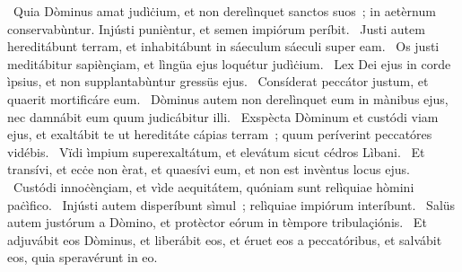 {~Quia Dòminus amat judìċium, et non derelìnquet sanctos suos~; in aetèrnum conservabùntur. Injústi punièntur, et semen impiórum períbit. 
~Justi autem hereditábunt terram, et inhabitábunt in sáeculum sáeculi super eam. 
~Os justi meditábitur sapiènçiam, et lìngüa ejus loquétur judìċium. 
~Lex Dei ejus in corde ìpsius, et non supplantabùntur gressüs ejus. 
~Consíderat peccátor justum, et quaerit mortificáre eum. 
~Dòminus autem non derelìnquet eum in mànibus ejus, nec damnábit eum quum judicábitur illi. 
~Exspècta Dòminum et custódi viam ejus, et exaltábit te ut hereditáte cápias terram~; quum períverint peccatóres vidébis. 
~Vïdi ìmpium superexaltátum, et elevátum sicut cédros Lìbani. 
~Et transívi, et ecċe non èrat, et quaesívi eum, et non est invèntus locus ejus. 
~Custódi innoċènçiam, et vìde aequitátem, quóniam sunt relìquiae hòmini paċìfico. 
~Injústi autem disperíbunt sìmul~; relìquiae impiórum interíbunt. 
~Salüs autem justórum a Dòmino, et protèctor eórum in tèmpore tribulaçiónis. 
~Et adjuvábit eos Dòminus, et liberábit eos, et éruet eos a peccatóribus, et salvábit eos, quia speravérunt in eo. 
}
